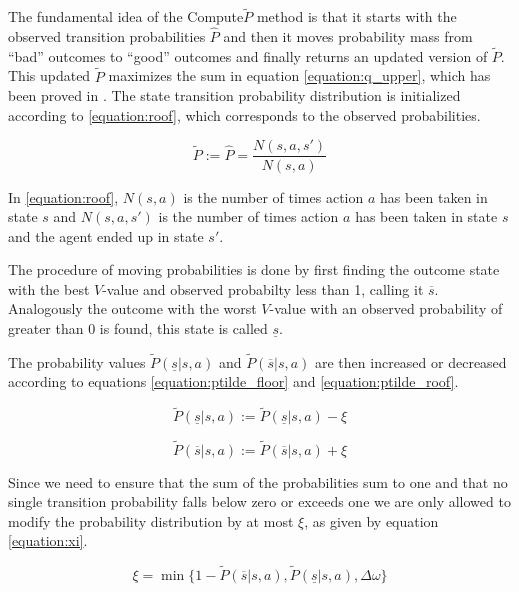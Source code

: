 The fundamental idea of the Compute$\tilde{P}$ method is that it starts with
the observed transition probabilities $\hat{P}$ and then it moves probability
mass from ``bad'' outcomes to ``good'' outcomes and finally returns an updated
version of $\tilde{P}$. This updated $\tilde{P}$ maximizes the sum in equation
\eqref{equation:q_upper}, which has been proved in \textcite{Strehl20081309}.
The state transition probability distribution is initialized according to
\eqref{equation:roof}, which corresponds to the observed probabilities.

\begin{equation}
\label{equation:roof}
\tilde{P} := \hat{P} = \frac{N(s,a,s')}{N(s,a)}
\end{equation}

In \eqref{equation:roof}, $N(s, a)$ is the number of times action $a$ has been taken in
state $s$ and $N(s, a, s')$ is the number of times action $a$ has been taken in
state $s$ and the agent ended up in state $s'$.

The procedure of moving probabilities is done by first finding the outcome
state with the best $V$-value and observed probabilty less than 1, calling it
$\overline{s}$. Analogously the outcome with the worst $V$-value with an
observed probability of greater than 0 is found, this state is called
$\underline{s}$. 

The probability values $\tilde{P}(\underline{s}|s,a)$ and
$\tilde{P}(\overline{s}|s,a)$ are then increased or decreased according to
equations \eqref{equation:ptilde_floor} and \eqref{equation:ptilde_roof}.

\begin{equation}
\label{equation:ptilde_floor}
\tilde{P}(\underline{s}|s,a) := \tilde{P}(\underline{s}|s,a)-\xi
\end{equation}

\begin{equation}
\label{equation:ptilde_roof}
\tilde{P}(\overline{s}|s,a) := \tilde{P}(\overline{s}|s,a)+\xi
\end{equation}

Since we need to ensure that the sum of the probabilities sum to one and that
no single transition probability falls below zero or exceeds one we are only
allowed to modify the probability distribution by at most $\xi$, as given by
equation \eqref{equation:xi}. 

\begin{equation}
\label{equation:xi}
\xi = \min\{
  1 - \tilde{P}(\overline{s} | s, a)
  , \tilde{P}(\underline{s} | s, a)
  , \Delta \omega 
\}
\end{equation}

